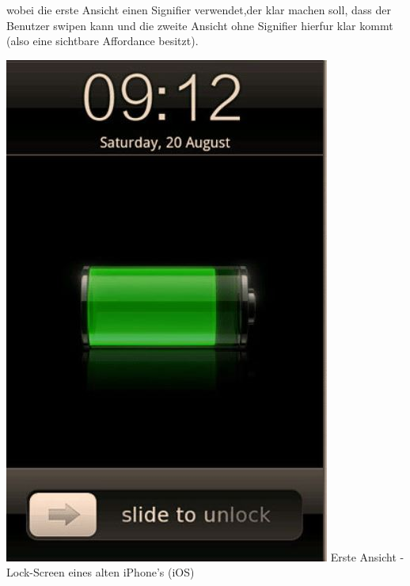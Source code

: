 wobei die erste Ansicht
einen Signifier verwendet,der klar machen soll, dass der Benutzer swipen
kann und die zweite Ansicht ohne Signifier hierfur klar kommt (also eine
sichtbare Affordance besitzt).

\includegraphics{images/iphonelock.JPG}
Erste Ansicht - Lock-Screen eines alten iPhone's (iOS)
